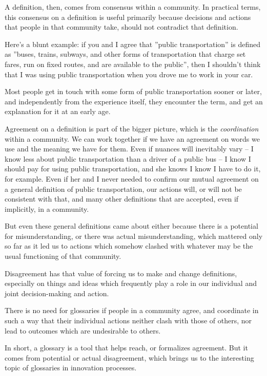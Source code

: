 A definition, then, comes from consensus within a community. In practical terms, this consensus on a definition is useful primarily because decisions and actions that people in that community take, should not contradict that definition.

Here's a blunt example: if you and I agree that ''public transportation'' is defined as ''buses, trains, subways, and other forms of transportation that charge set fares, run on fixed routes, and are available to the public'', then I shouldn't think that I was using public transportation when you drove me to work in your car.

Most people get in touch with some form of public transportation sooner or later, and independently from the experience itself, they encounter the term, and get an explanation for it at an early age. 

Agreement on a definition is part of the bigger picture, which is the \textit{coordination} within a community. We can work together if we have an agreement on words we use and the meaning we have for them. Even if nuances will inevitably vary -- I know less about public transportation than a driver of a public bus -- I know I should pay for using public transportation, and she knows I know I have to do it, for example. Even if her and I never needed to confirm our mutual agreement on a general definition of public transportation, our actions will, or will not be consistent with that, and many other definitions that are accepted, even if implicitly, in a community.

But even these general definitions came about either because there is a potential for misunderstanding, or there was actual misunderstanding, which mattered only so far as it led us to actions which somehow clashed with whatever may be the usual functioning of that community. 

Disagreement has that value of forcing us to make and change definitions, especially on things and ideas which frequently play a role in our individual and joint decision-making and action. 

There is no need for glossaries if people in a community agree, and coordinate in such a way that their individual actions neither clash with those of others, nor lead to outcomes which are undesirable to others. 

In short, a glossary is a tool that helps reach, or formalizes agreement. But it comes from potential or actual disagreement, which brings us to the interesting topic of glossaries in innovation processes.

